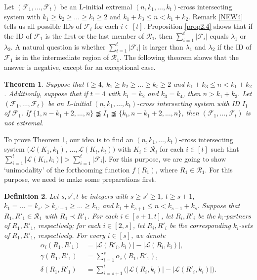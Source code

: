 \documentclass[a4paper,11pt]{article}
\newtheorem{theorem}{Theorem}[section]
\newtheorem{definition}[theorem]{Definition}
\begin{document}
Let $(\mathcal{F}_1, \dots, \mathcal{F}_t)$ be an L-initial extremal $(n, k_1, \dots, k_t)$-cross intersecting system with $k_1\geq k_2\geq\dots\geq k_t\geq 2$ and $k_1+k_3\leq n <k_1+k_2$.
 Remark \ref{NEW4} tells us all  possible IDs of $\mathcal{F}_i$ for each $i\in [t]$.
Proposition \ref{prop2.4} shows that if the ID of $\mathcal{F}_1$ is the first or the last member of $\mathcal{R}_1$, then $\sum_{i=1}^t|\mathcal{F}_i|$ equals $\lambda_1$ or $\lambda_2$. A natural question is whether $\sum_{i=1}^t|\mathcal{F}_i|$ is larger than $\lambda_1$ and $\lambda_2$ if the ID of $\mathcal{F}_1$ is in the intermediate region of $\mathcal{R}_1$.
The following theorem shows that the answer is negative, except for an  exceptional  case.

\begin{theorem}\label{AS+}
Suppose that $t\geq 4$, $k_1\geq k_2\geq\dots\geq k_t\geq 2$ and $k_1+k_3\leq n <k_1+k_2$. Additionly, suppose that if $t= 4$ with $k_1=k_2$ and $k_3=k_4$, then $n>k_1+k_3$.
Let $(\mathcal{F}_1, \dots, \mathcal{F}_t)$ be an L-initial $(n, k_1, \dots, k_t)$-cross intersecting system with ID $I_1$ of $\mathcal{F}_1$.
If $\{1, n-k_1+2, \dots, n\}\precneqq   I_1\precneqq \{k_t, n-k_1+2, \dots, n\}$, then $(\mathcal{F}_1, \dots, \mathcal{F}_t)$ is not extremal.
\end{theorem}

To prove Theorem \ref{AS+}, our idea is to find an $(n, k_1, \dots, k_t)$-cross intersecting system $(\mathcal{L}(K_1, k_1)$, $\dots, \mathcal{L}(K_t, k_t))$ with $K_i \in \mathcal{R}_i$ for each $i\in [t]$ such that $\sum_{i=1}^t|\mathcal{L}(K_i, k_i)|>\sum_{i=1}^t|\mathcal{F}_i|$.
For this purpose, we are going to show `unimodality'  of the forthcoming function $f(R_1)$, where $R_1\in \mathcal{R}_1$. For this purpose, we need to make some preparations first.



\begin{definition}\label{ab}
Let $s, s', t$ be integers with $s\geq s'\geq 1$, $t\geq s+1$, $k_1=\dots=k_{s'}> k_{s'+1}\geq\dots\geq k_t$, and $k_1+k_{s+1}\leq n <k_{s-1}+k_s$.
Suppose that $R_1, R'_1\in \mathcal{R}_1$ with $R_1\prec R'_1$. For each $i\in [s+1, t]$, let $R_i, R'_i$ be the $k_i$-partners of $R_1, R'_1$, respectively; for each $i\in [2, s]$, let $R_i, R'_i$ be the corresponding $k_i$-sets of $R_1, R'_1$, respectively.
For every $i\in [s]$, we denote
\begin{align*}
\alpha_i(R_1, R'_1)&=|\mathcal{L}(R'_i, k_i)|-|\mathcal{L}(R_i, k_i)|,\\
\gamma(R_1, R'_1)&=\sum_{i=1}^s\alpha_i(R_1, R'_1),\\
\delta(R_1, R'_1)&=\sum_{i=s+1}^t\big(|\mathcal{L}(R_i, k_i)|-|\mathcal{L}(R'_i, k_i)|\big).
\end{align*}
\end{definition}
\end{document}
